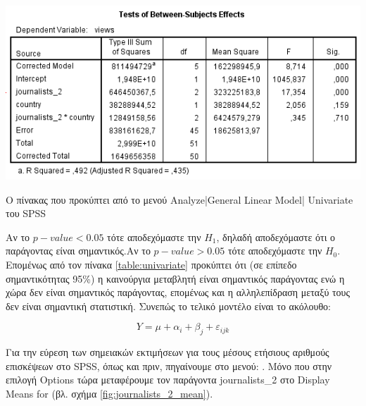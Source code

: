 \documentclass{assignment}
\begin{document}
\begin{Assignment}[Μέρος Δ]
\begin{table}[htbp]
\includegraphics[width=\textwidth]{images/table_univariate.png}
\caption{Ο πίνακας που προκύπτει από το μενού Analyze|General Linear Model| Univariate του SPSS }
\label{table:univariate}
\end{table}

Αν το $p-value<0.05$ τότε αποδεχόμαστε την $H_1$, δηλαδή αποδεχόμαστε ότι ο παράγοντας είναι σημαντικός.Αν το $p-value>0.05$ τότε αποδεχόμαστε την $H_0$. Επομένως από τον πίνακα \ref{table:univariate} προκύπτει ότι (σε επίπεδο σημαντικότητας 95\%) η καινούργια μεταβλητή  είναι σημαντικός παράγοντας ενώ η χώρα δεν είναι σημαντικός παράγοντας, επομένως και η αλληλεπίδραση μεταξύ τους δεν είναι σημαντική στατιστική. Συνεπώς το τελικό μοντέλο είναι το ακόλουθο:

\begin{equation}
Y = \mu + \alpha_i + \beta_j + \varepsilon_{ijk} 
\end{equation}



Για την εύρεση των σημειακών εκτιμήσεων για τους μέσους ετήσιους αριθμούς επισκέψεων στο SPSS, όπως και πριν, πηγαίνουμε στο μενού: . Μόνο που στην επιλογή Options τώρα μεταφέρουμε τον παράγοντα journalists\_2 στο Display Means for (βλ. σχήμα \ref{fig:journalists_2_mean}).



\end{Assignment}
\end{document}
